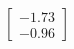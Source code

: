\documentclass[preview]{standalone}
\begin{document}
\begin{align*}
\begin{bmatrix} -1.73 \\ -0.96 \end{bmatrix}
\end{align*}
\end{document}
